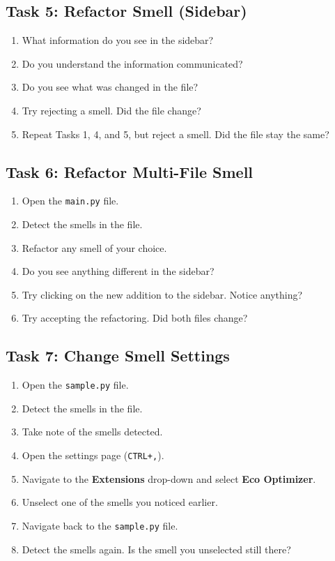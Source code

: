 \documentclass[12pt, titlepage]{article}
\begin{document}
\subsection*{Task 5: Refactor Smell (Sidebar)}
\begin{enumerate}
  \item What information do you see in the sidebar?
  \item Do you understand the information communicated?
  \item Do you see what was changed in the file?
  \item Try rejecting a smell. Did the file change?
  \item Repeat Tasks 1, 4, and 5, but reject a smell. Did the file
    stay the same?
\end{enumerate}

\subsection*{Task 6: Refactor Multi-File Smell}
\begin{enumerate}
  \item Open the \texttt{main.py} file.
  \item Detect the smells in the file.
  \item Refactor any smell of your choice.
  \item Do you see anything different in the sidebar?
  \item Try clicking on the new addition to the sidebar. Notice anything?
  \item Try accepting the refactoring. Did both files change?
\end{enumerate}

\subsection*{Task 7: Change Smell Settings}
\begin{enumerate}
  \item Open the \texttt{sample.py} file.
  \item Detect the smells in the file.
  \item Take note of the smells detected.
  \item Open the settings page (\texttt{CTRL+,}).
  \item Navigate to the \textbf{Extensions} drop-down and select
    \textbf{Eco Optimizer}.
  \item Unselect one of the smells you noticed earlier.
  \item Navigate back to the \texttt{sample.py} file.
  \item Detect the smells again. Is the smell you unselected still there?
\end{enumerate}
\end{document}
